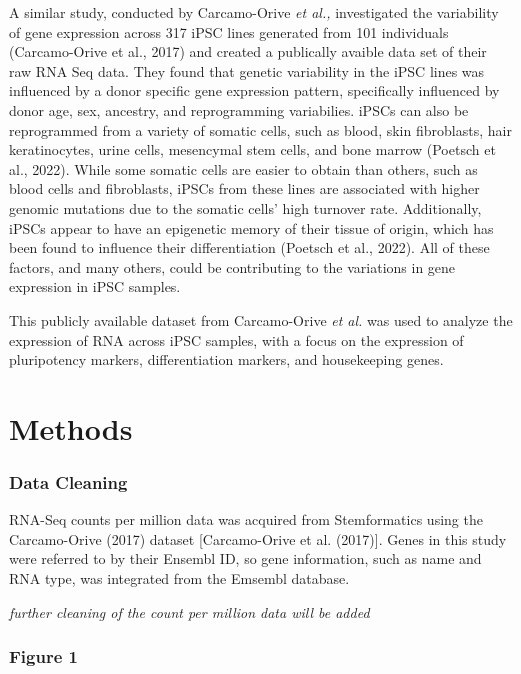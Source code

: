 \documentclass[
  letterpaper,
  DIV=11,
  numbers=noendperiod]{scrartcl}
\begin{document}
A similar study, conducted by Carcamo-Orive \emph{et al.,} investigated
the variability of gene expression across 317 iPSC lines generated from
101 individuals (Carcamo-Orive et al., 2017) and created a publically
avaible data set of their raw RNA Seq data. They found that genetic
variability in the iPSC lines was influenced by a donor specific gene
expression pattern, specifically influenced by donor age, sex, ancestry,
and reprogramming variabilies. iPSCs can also be reprogrammed from a
variety of somatic cells, such as blood, skin fibroblasts, hair
keratinocytes, urine cells, mesencymal stem cells, and bone marrow
(Poetsch et al., 2022). While some somatic cells are easier to obtain
than others, such as blood cells and fibroblasts, iPSCs from these lines
are associated with higher genomic mutations due to the somatic cells'
high turnover rate. Additionally, iPSCs appear to have an epigenetic
memory of their tissue of origin, which has been found to influence
their differentiation (Poetsch et al., 2022). All of these factors, and
many others, could be contributing to the variations in gene expression
in iPSC samples.

This publicly available dataset from Carcamo-Orive \emph{et al.} was
used to analyze the expression of RNA across iPSC samples, with a focus
on the expression of pluripotency markers, differentiation markers, and
housekeeping genes.

\section{Methods}\label{methods}

\subsubsection{Data Cleaning}\label{data-cleaning}

RNA-Seq counts per million data was acquired from Stemformatics using
the Carcamo-Orive (2017) dataset {[}Carcamo-Orive et al. (2017){]}.
Genes in this study were referred to by their Ensembl ID, so gene
information, such as name and RNA type, was integrated from the Emsembl
database.

\emph{further cleaning of the count per million data will be added}

\subsubsection{Figure 1}\label{figure-1}
\end{document}
